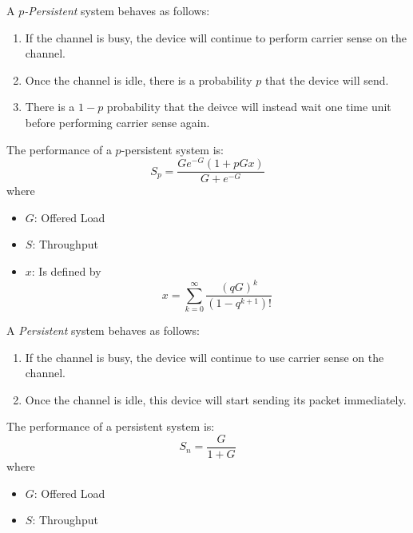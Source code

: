 \begin{definition}[$p$-Persistent]\label{def:p_Persistent}
  A \emph{$p$-Persistent} system behaves as follows:
  \begin{enumerate}[noitemsep]
  \item If the channel is busy, the device will continue to perform carrier sense on the channel.
  \item Once the channel is idle, there is a probability $p$ that the device will send.
  \item There is a $1-p$ probability that the deivce will instead wait one time unit before performing carrier sense again.
  \end{enumerate}

  The performance of a $p$-persistent system is:
  \begin{equation}\label{eq:p_Persistent_Performance}
    S_{p} = \frac{G e^{-G} (1+pGx)}{G + e^{-G}}
  \end{equation}
  where
  \begin{itemize}[noitemsep]
  \item $G$: Offered Load
  \item $S$: Throughput
  \item $x$: Is defined by 
    \begin{equation}\label{eq:p_Persistent_x_Value}
      x = \sum\limits_{k=0}^{\infty} \frac{{(qG)}^{k}}{(1-q^{k+1})!}
    \end{equation}
  \end{itemize}
\end{definition}

\begin{definition}[Persistent]\label{def:Persistent}
  A \emph{Persistent} system behaves as follows:
  \begin{enumerate}[noitemsep]
  \item If the channel is busy, the device will continue to use carrier sense on the channel.
  \item Once the channel is idle, this device will start sending its packet immediately.
  \end{enumerate}

  The performance of a persistent system is:
  \begin{equation}\label{eq:Persistent_Performance}
    S_{n} = \frac{G}{1+G}
  \end{equation}
  where
  \begin{itemize}[noitemsep]
  \item $G$: Offered Load
  \item $S$: Throughput
  \end{itemize}
\end{definition}

